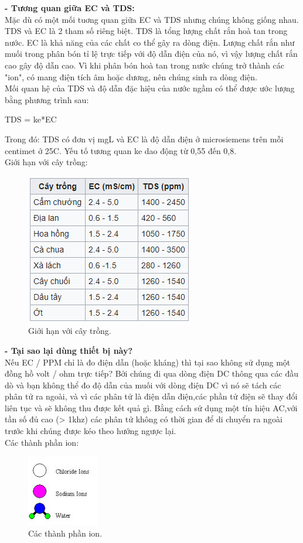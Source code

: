 \documentclass[a4paper,12pt,oneside]{article}
\begin{document}
\textbf{- Tương quan giữa EC và TDS:}\\
Mặc dù có một mối tuơng quan giữa EC và TDS nhưng chúng không giống nhau. TDS và EC là 2 tham số riêng biệt. TDS là tổng lượng chất rắn hoà tan trong nước. EC là khả năng của các chất co thể gây ra dòng điện. Lượng chất rắn như muối trong phân bón tỉ lệ trực tiếp với độ dẫn điện của nó, vì vậy lượng chất rắn cao gây độ dẫn cao. Vì khi phân bón hoà tan trong nước chúng trở thành các "ion", có mang điện tích âm hoặc dương, nên chúng sinh ra dòng điện.\\
Mối quan hệ của TDS và độ dẫn đặc hiệu của nước ngầm có thể được ước lượng bằng phương trình sau:
\begin{center}
		TDS = ke*EC
\end{center}					
Trong đó: TDS có đơn vị mg\/L và EC là độ dẫn điện ở microsiemens trên mỗi centimet ở 25\textdegree{}C. Yếu tố tương quan ke dao động từ 0,55 đến 0,8.\\
Giới hạn với cây trồng:
\begin{figure}[H]
\centering
\begin{center}
\includegraphics[scale=.8]{hinh/PPM/ppm_thamkhao.PNG}
\end{center}
\caption{Giới hạn với cây trồng.}
\end{figure}

\textbf{- Tại sao lại dùng thiết bị này?}\\
Nếu EC / PPM chỉ là đo điện dẫn (hoặc kháng) thì tại sao không sử dụng một đồng hồ volt / ohm trực tiếp? Bởi chúng đi qua dòng điện DC thông qua các đầu dò và bạn không thể đo độ dẫn của muối với dòng điện DC vì nó sẽ tách các phân tử ra ngoài, và vì các phân tử là điện dẫn điện,các phần tử điện sẽ thay đổi liên tục và sẽ không thu được kết quả gì. Bằng cách sử dụng một tín hiệu AC,với tần số đủ cao (> 1khz) các phân tử không có thời gian để di chuyển ra ngoài trước khi chúng được kéo theo hướng ngược lại.\\
Các thành phần ion:
\begin{figure}[H]
\centering
\begin{center}
\includegraphics[scale=1]{hinh/PPM/ppm_ion.png}
\end{center}
\caption{Các thành phần ion.}
\end{figure}
\end{document}
